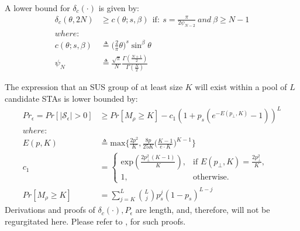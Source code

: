 A lower bound for $\delta_c(\cdot)$ is given by:
\begin{equation}\label{eq:delta_c_lbnd}
    \begin{aligned}
        \delta_c(\theta,2N) &\geq c(\theta;s,\beta)\ \ \text{if}: \ s = \frac{\pi}{2\psi_{N-2}} \ and \ \beta \geq N-1\\
        where:\\
        c(\theta;s,\beta) &\triangleq \bigg(\frac{2}{\pi}\theta\bigg)^s\sin^\beta\theta\\
        \psi_N &\triangleq \frac{\sqrt{\pi}}{N}\frac{\Gamma(\frac{N+1}{2})}{\Gamma(\frac{N}{2})}
    \end{aligned}
\end{equation}

The expression that an SUS group of at least size $K$ will exist within a  pool of $L$ candidate STAs is lower bounded by:
\begin{equation}\label{eq:p_exist}
    \begin{aligned}
        Pr_\epsilon = Pr[\vert \mathcal{S}_\epsilon \vert > 0] &\geq Pr[M_\rho \geq K] - c_1 ( 1 + p_s (e^{-E(p_\perp,K)} -1 ))^L\\
        where:\\
        E(p,K) &\triangleq \text{max}\bigg \lbrace \frac{2p^2}{K},\frac{8p}{25K}\big(\frac{K-1}{e\cdot K}\big)^{K-1}\bigg \rbrace \\
        c_1 &=  \begin{cases}
                    \text{exp}(\frac{2p_\perp^2(K-1)}{K}), & \text{if } E(p_\perp,K) = \frac{2p_\perp^2}{K}, \\
                    1, & \text{otherwise}.
                \end{cases}\\
        Pr[M_\rho \geq K]&= \sum_{j=K}^{L}\binom{L}{j}p_s^j (1-p_s)^{L-j}
    \end{aligned}
\end{equation}
Derivations and proofs of $\delta_c(\cdot), P_\epsilon$ are length, and, therefore, will not be regurgitated here. Please refer to \cite{Swannack2005}, \cite{SwannackThesis} for such proofs.